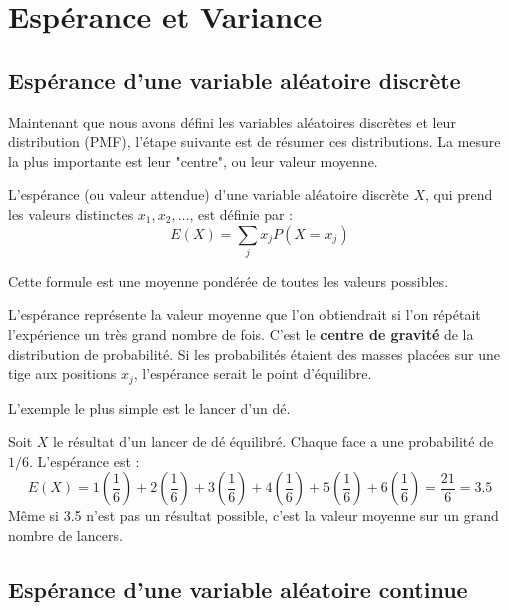 \newpage
\section{Espérance et Variance }

\subsection{Espérance d'une variable aléatoire discrète}

Maintenant que nous avons défini les variables aléatoires discrètes et leur distribution (PMF), l'étape suivante est de résumer ces distributions. La mesure la plus importante est leur "centre", ou leur valeur moyenne.

\begin{definitionbox}
L'espérance (ou valeur attendue) d'une variable aléatoire discrète $X$, qui prend les valeurs distinctes $x_1, x_2, \dots$, est définie par :
$$ E(X) = \sum_j x_j P(X=x_j) $$
\end{definitionbox}

Cette formule est une moyenne pondérée de toutes les valeurs possibles.

\begin{intuitionbox}
L'espérance représente la valeur moyenne que l'on obtiendrait si l'on répétait l'expérience un très grand nombre de fois. C'est le \textbf{centre de gravité} de la distribution de probabilité. Si les probabilités étaient des masses placées sur une tige aux positions $x_j$, l'espérance serait le point d'équilibre.
\end{intuitionbox}

L'exemple le plus simple est le lancer d'un dé.

\begin{examplebox}[Lancer d'un dé]
Soit $X$ le résultat d'un lancer de dé équilibré. Chaque face a une probabilité de $1/6$. L'espérance est :
$$ E(X) = 1\left(\frac{1}{6}\right) + 2\left(\frac{1}{6}\right) + 3\left(\frac{1}{6}\right) + 4\left(\frac{1}{6}\right) + 5\left(\frac{1}{6}\right) + 6\left(\frac{1}{6}\right) = \frac{21}{6} = 3.5 $$
Même si 3.5 n'est pas un résultat possible, c'est la valeur moyenne sur un grand nombre de lancers.
\end{examplebox}

\subsection{Espérance d'une variable aléatoire continue}

